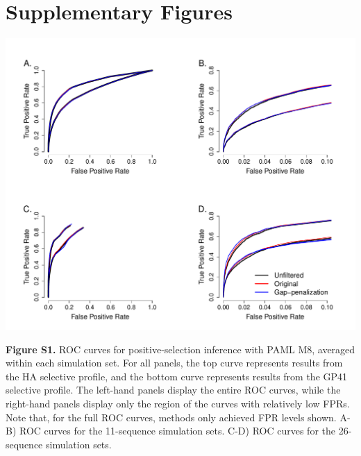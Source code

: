 \documentclass[11pt]{article}
\begin{document}
\newpage
\section{Supplementary Figures}


\centerline{\includegraphics[width=6.5in]{Figures/ROC_SI_paml.pdf}}
\noindent \textbf{Figure S1.} ROC curves for positive-selection inference with PAML M8, averaged within each simulation set. For all panels, the top curve represents results from the HA selective profile, and the bottom curve represents results from the GP41 selective profile. The left-hand panels display the entire ROC curves, while the right-hand panels display only the region of the curves with relatively low FPRs. Note that, for the full ROC curves, methods only achieved FPR levels shown. A-B) ROC curves for the 11-sequence simulation sets. C-D) ROC curves for the 26-sequence simulation sets.
\end{document}
